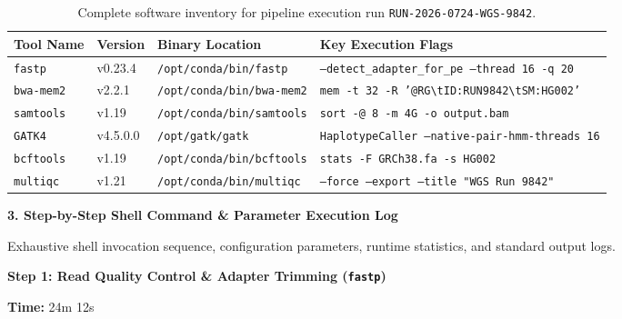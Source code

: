 \documentclass[10pt,a4paper]{article}
\newcommand{\badge}[2]{%
  \tcbox[on line, arc=3pt, colback=#1, colframe=#1, boxrule=0pt, top=1.5pt, bottom=1.5pt, left=5pt, right=5pt]{%
    \scriptsize\bfseries #2%
  }%
}
\newcommand{\sectionheading}[2]{%
  \vspace{6pt}%
  \begin{tcolorbox}[sectiontitle]%
    \normalsize\bfseries\color{NavyDark}#1 \quad \small\color{TextMuted}#2%
  \end{tcolorbox}%
  \vspace{2pt}%
}
\begin{document}
\begin{table}[h!]
\centering
\scriptsize
{}
\begin{tabularx}{\textwidth}{@{}l l l X@{}}
\toprule
\textbf{Tool Name} & \textbf{Version} & \textbf{Binary Location} & \textbf{Key Execution Flags} \\
\midrule
\texttt{fastp} & v0.23.4 & \texttt{/opt/conda/bin/fastp} & \texttt{--detect\_adapter\_for\_pe --thread 16 -q 20} \\{}
\texttt{bwa-mem2} & v2.2.1 & \texttt{/opt/conda/bin/bwa-mem2} & \texttt{mem -t 32 -R '@RG\textbackslash tID:RUN9842\textbackslash tSM:HG002'} \\{}
\texttt{samtools} & v1.19 & \texttt{/opt/conda/bin/samtools} & \texttt{sort -@ 8 -m 4G -o output.bam} \\{}
\texttt{GATK4} & v4.5.0.0 & \texttt{/opt/gatk/gatk} & \texttt{HaplotypeCaller --native-pair-hmm-threads 16} \\{}
\texttt{bcftools} & v1.19 & \texttt{/opt/conda/bin/bcftools} & \texttt{stats -F GRCh38.fa -s HG002} \\{}
\texttt{multiqc} & v1.21 & \texttt{/opt/conda/bin/multiqc} & \texttt{--force --export --title "WGS Run 9842"} \\
\bottomrule
\end{tabularx}
\caption{Complete software inventory for pipeline execution run \texttt{RUN-2026-0724-WGS-9842}.}
\label{tab:software}
\end{table}

\pagebreak

\sectionheading{3. Step-by-Step Shell Command \& Parameter Execution Log}{\faTerminal}

{\small Exhaustive shell invocation sequence, configuration parameters, runtime statistics, and standard output logs.}

\vspace{4pt}

\noindent
\begin{minipage}[t]{0.70\textwidth}
  \normalsize\bfseries\color{NavyDark} Step 1: Read Quality Control \& Adapter Trimming (\texttt{fastp})
\end{minipage}%
\hfill
\begin{minipage}[t]{0.28\textwidth}
  \raggedleft
  \badge{StatusGreenBg}{\color{StatusGreen}\faCheck~\,PASS} \quad
  \scriptsize\textbf{Time:} 24m 12s
\end{minipage}
\end{document}
